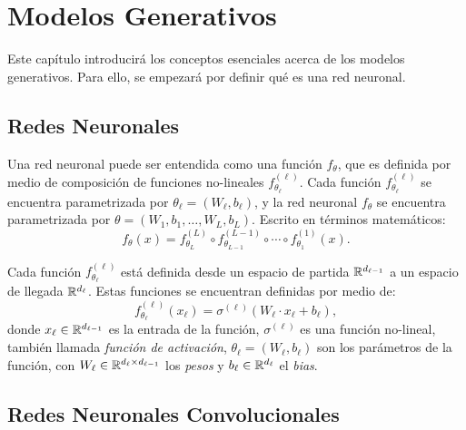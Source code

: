 \chapter{Modelos Generativos}\label{chap:modelos-generativos}
{
    Este capítulo introducirá los conceptos esenciales acerca de los modelos generativos. Para ello, se empezará por definir qué es una red neuronal.
    \section{Redes Neuronales}\label{sec:redes-Neuronales}
    {
        Una red neuronal puede ser entendida como una función $f_\theta$, que es definida por medio de composición de funciones no-lineales $f^{(\ell)}_{\theta_\ell}$. Cada función $f^{(\ell)}_{\theta_\ell}$ se encuentra parametrizada por $\theta_\ell = (W_\ell, b_\ell)$, y la red neuronal $f_\theta$ se encuentra parametrizada por $\theta = (W_{1}, b_1, \ldots, W_L, b_L)$. Escrito en términos matemáticos:
        \begin{equation}
            f_\theta(x) = f^{(L)}_{\theta_{L}} \circ f^{(L-1)}_{\theta_{L-1}} \circ \cdots \circ f^{(1)}_{\theta_{1}} (x).
        \end{equation}

        Cada función $f^{(\ell)}_{\theta_{\ell}}$ está definida desde un espacio de partida $\mathbb{R}^{d_{\ell-1}}$ a un espacio de llegada $\mathbb{R}^{d_\ell}$. Estas funciones se encuentran definidas por medio de:
        \begin{equation}
            f^{(\ell)}_{\theta_{\ell}} (x_\ell) = \sigma^{(\ell)} (W_\ell \cdot x_\ell + b_\ell),
        \end{equation}
        donde $x_\ell \in \mathbb{R}^{d_{\ell-1}}$ es la entrada de la función, $\sigma^{(\ell)}$ es una función no-lineal, también llamada \emph{función de activación}, $\theta_\ell = (W_\ell, b_\ell)$ son los parámetros de la función, con $W_\ell \in \mathbb{R}^{d_{\ell} \times d_{\ell-1}}$ los \emph{pesos} y $b_\ell \in \mathbb{R}^{d_\ell}$ el \emph{bias}.

        \section{Redes Neuronales Convolucionales}\label{sec:redes-neuronales-convolucionales}
        {
        }  %

}}
